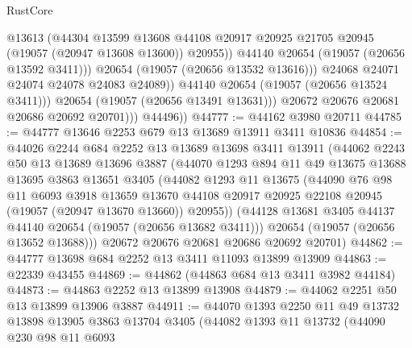 \begin{lexlean}{RustCore}
\begin{coremodule}
                            @13613
                            (@44304
                              @13599
                              @13608
                              @44108
                              @20917
                              @20925
                              @21705
                              @20945
                              (@19057 (@20947 @13608 @13600))
                              @20955))
                          @44140
                          @20654
                          (@19057 (@20656 @13592 @3411)))
                        @20654
                        (@19057 (@20656 @13532 @13616)))
                      @24068
                      @24071
                      @24074
                      @24078
                      @24083
                      @24089))
                  @44140
                  @20654
                  (@19057 (@20656 @13524 @3411)))
                @20654
                (@19057 (@20656 @13491 @13631)))
              @20672
              @20676
              @20681
              @20686
              @20692
              @20701)))
        @44496))
@44777 := @44162 @3980 @20711
@44785 := @44777 @13646 @2253 @679 @13 @13689 @13911 @3411 @10836
@44854 := @44026
    @2244
    @684
    @2252
    @13
    @13689
    @13698
    @3411
    @13911
    (@44062
      @2243
      @50
      @13
      @13689
      @13696
      @3887
      (@44070
        @1293
        @894
        @11
        @49
        @13675
        @13688
        @13695
        @3863
        @13651
        @3405
        (@44082
          @1293
          @11
          @13675
          (@44090
            @76
            @98
            @11
            @6093
            @3918
            @13659
            @13670
            @44108
            @20917
            @20925
            @22108
            @20945
            (@19057 (@20947 @13670 @13660))
            @20955))
        (@44128 @13681 @3405 @44137 @44140 @20654 (@19057 (@20656 @13682 @3411)))
        @20654
        (@19057 (@20656 @13652 @13688)))
      @20672
      @20676
      @20681
      @20686
      @20692
      @20701)
@44862 := @44777 @13698 @684 @2252 @13 @3411 @11093 @13899 @13909
@44863 := @22339 @43455
@44869 := @44862 (@44863 @684 @13 @3411 @3982 @44184)
@44873 := @44863 @2252 @13 @13899 @13908
@44879 := @44062 @2251 @50 @13 @13899 @13906 @3887
@44911 := @44070
    @1393
    @2250
    @11
    @49
    @13732
    @13898
    @13905
    @3863
    @13704
    @3405
    (@44082
      @1393
      @11
      @13732
      (@44090
        @230
        @98
        @11
        @6093

\end{coremodule}
\end{lexlean}
